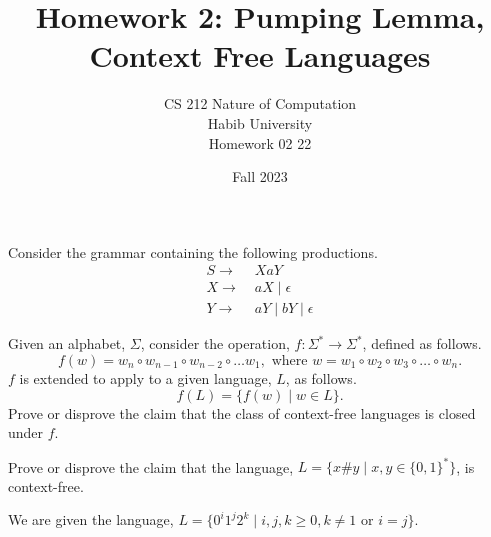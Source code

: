\documentclass[addpoints]{exam}
\title{Homework 2: Pumping Lemma, Context Free Languages}
\author{CS 212 Nature of Computation\\Habib University\\Homework 02 22}
\date{Fall 2023}
\begin{document}
\maketitle

\begin{questions}

  \question Consider the grammar containing the following productions.
  \begin{align*}
    S \to & \; XaY                      \\
    X \to & \; aX \mid \epsilon         \\
    Y \to & \; aY \mid bY \mid \epsilon
  \end{align*}


  \question[5] Given an alphabet, $\Sigma$, consider the operation, $f:\Sigma^*\to\Sigma^*$, defined as follows.
  \[
    f(w) = w_n\circ w_{n-1}\circ w_{n-2}\circ\ldots w_{1}, \text{ where } w = w_1\circ w_2\circ w_3\circ\ldots\circ w_n.
  \]
  $f$ is extended to apply to a given language, $L$, as follows.
  \[
    f(L) = \{ f(w) \mid w\in L \}.
  \]
  Prove or disprove the claim that the class of context-free languages is closed under $f$.

  \question[5] Prove or disprove the claim that the language, $L=\{ x\#y \mid x,y\in\{0,1\}^*\}$, is context-free.

  \question We are given the language, $L = \{0^i1^j2^k \mid i,j,k \geq 0, k \neq 1 \text{ or } i = j\}$.
\end{questions}
\end{document}
